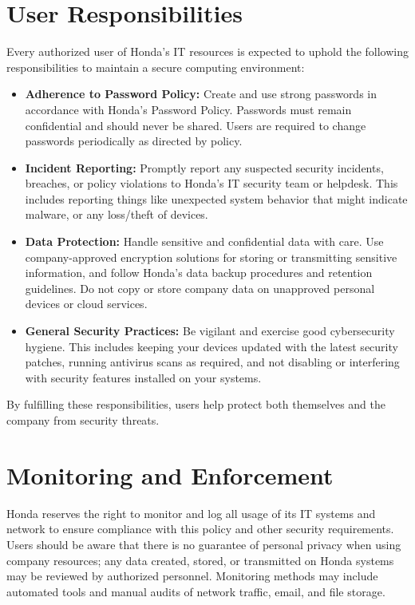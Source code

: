 \section{User Responsibilities}
Every authorized user of Honda's IT resources is expected to uphold the following responsibilities to maintain a secure computing environment:
\begin{itemize}
    \item \textbf{Adherence to Password Policy:} Create and use strong passwords in accordance with Honda's Password Policy. Passwords must remain confidential and should never be shared. Users are required to change passwords periodically as directed by policy.
    \item \textbf{Incident Reporting:} Promptly report any suspected security incidents, breaches, or policy violations to Honda's IT security team or helpdesk. This includes reporting things like unexpected system behavior that might indicate malware, or any loss/theft of devices.
    \item \textbf{Data Protection:} Handle sensitive and confidential data with care. Use company-approved encryption solutions for storing or transmitting sensitive information, and follow Honda's data backup procedures and retention guidelines. Do not copy or store company data on unapproved personal devices or cloud services.
    \item \textbf{General Security Practices:} Be vigilant and exercise good cybersecurity hygiene. This includes keeping your devices updated with the latest security patches, running antivirus scans as required, and not disabling or interfering with security features installed on your systems.
\end{itemize}
By fulfilling these responsibilities, users help protect both themselves and the company from security threats.

\section{Monitoring and Enforcement}
Honda reserves the right to monitor and log all usage of its IT systems and network to ensure compliance with this policy and other security requirements. Users should be aware that there is no guarantee of personal privacy when using company resources; any data created, stored, or transmitted on Honda systems may be reviewed by authorized personnel. Monitoring methods may include automated tools and manual audits of network traffic, email, and file storage.

